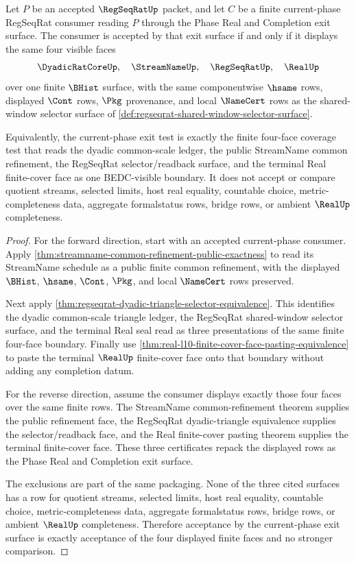 \begin{theorem}
\label{thm:regseqrat-finite-four-face-current-phase-exit-coverage}
Let $P$ be an accepted $\RegSeqRatUp$ packet, and let $C$ be a finite current-phase RegSeqRat consumer reading $P$ through the Phase Real and Completion exit surface. The consumer is accepted by that exit surface if and only if it displays the same four visible faces
$$
\DyadicRatCoreUp,\quad \StreamNameUp,\quad \RegSeqRatUp,\quad \RealUp
$$
over one finite $\BHist$ surface, with the same componentwise $\hsame$ rows, displayed $\Cont$ rows, $\Pkg$ provenance, and local $\NameCert$ rows as the shared-window selector surface of \autoref{def:regseqrat-shared-window-selector-surface}.

Equivalently, the current-phase exit test is exactly the finite four-face coverage test that reads the dyadic common-scale ledger, the public StreamName common refinement, the RegSeqRat selector/readback surface, and the terminal Real finite-cover face as one BEDC-visible boundary. It does not accept or compare quotient streams, selected limits, host real equality, countable choice, metric-completeness data, aggregate formalstatus rows, bridge rows, or ambient $\RealUp$ completeness.
\end{theorem}
\begin{proof}
For the forward direction, start with an accepted current-phase consumer. Apply \autoref{thm:streamname-common-refinement-public-exactness} to read its StreamName schedule as a public finite common refinement, with the displayed $\BHist$, $\hsame$, $\Cont$, $\Pkg$, and local $\NameCert$ rows preserved.

Next apply \autoref{thm:regseqrat-dyadic-triangle-selector-equivalence}. This identifies the dyadic common-scale triangle ledger, the RegSeqRat shared-window selector surface, and the terminal Real seal read as three presentations of the same finite four-face boundary. Finally use \autoref{thm:real-l10-finite-cover-face-pasting-equivalence} to paste the terminal $\RealUp$ finite-cover face onto that boundary without adding any completion datum.

For the reverse direction, assume the consumer displays exactly those four faces over the same finite rows. The StreamName common-refinement theorem supplies the public refinement face, the RegSeqRat dyadic-triangle equivalence supplies the selector/readback face, and the Real finite-cover pasting theorem supplies the terminal finite-cover face. These three certificates repack the displayed rows as the Phase Real and Completion exit surface.

The exclusions are part of the same packaging. None of the three cited surfaces has a row for quotient streams, selected limits, host real equality, countable choice, metric-completeness data, aggregate formalstatus rows, bridge rows, or ambient $\RealUp$ completeness. Therefore acceptance by the current-phase exit surface is exactly acceptance of the four displayed finite faces and no stronger comparison.
\end{proof}


